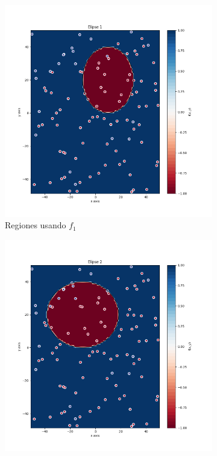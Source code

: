 \documentclass[
  a4paper,
  spanish,
  12pt,
  enlargefirstpage,
]{scrartcl}
\begin{document}
\begin{figure}
\centering
\begin{subfigure}{0.5\textwidth}
  \centering
  \includegraphics[width=\linewidth]{img/RegElipse1.png}
  \caption{Regiones usando \(f_1\)}
  \label{fig:sub1}
\end{subfigure}%
\begin{subfigure}{.5\textwidth}
  \centering
  \includegraphics[width=\linewidth]{img/RegElipse2.png}

\end{subfigure}
\end{figure}
\end{document}
